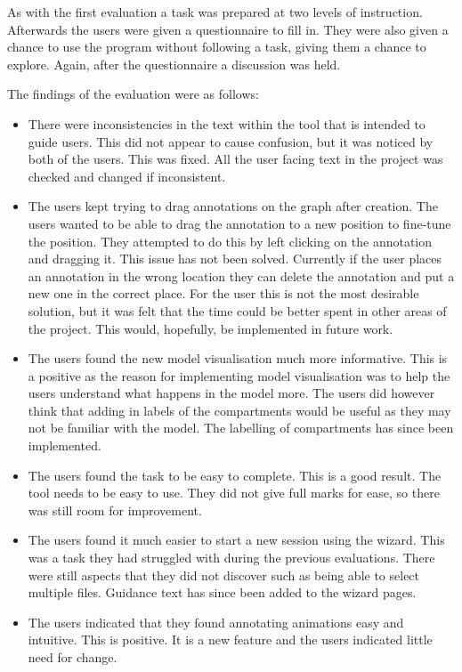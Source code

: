 As with the first evaluation a task was prepared at two levels of instruction.  Afterwards the users were given a questionnaire to fill in.  They were also given a chance to use the program without following a task, giving them a chance to explore.  Again, after the questionnaire a discussion was held.

The findings of the evaluation were as follows:

\begin{itemize}
\item There were inconsistencies in the text within the tool that is intended to guide users.  This did not appear to cause confusion, but it was noticed by both of the users.  This was fixed.  All the user facing text in the project was checked and changed if inconsistent.
\item The users kept trying to drag annotations on the graph after creation. The users wanted to be able to drag the annotation to a new position to fine-tune the position.  They attempted to do this by left clicking on the annotation and dragging it.  This issue has not been solved.  Currently if the user places an annotation in the wrong location they can delete the annotation and put a new one in the correct place.  For the user this is not the most desirable solution, but it was felt that the time could be better spent in other areas of the project.  This would, hopefully, be implemented in future work.
\item The users found the new model visualisation much more informative.  This is a positive as the reason for implementing model visualisation was to help the users understand what happens in the model more.  The users did however think that adding in labels of the compartments would be useful as they may not be familiar with the model.  The labelling of compartments has since been implemented.
\item The users found the task to be easy to complete.  This is a good result.  The tool needs to be easy to use.  They did not give full marks for ease, so there was still room for improvement.
\item The users found it much easier to start a new session using the wizard.  This was a task they had struggled with during the previous evaluations.  There were still aspects that they did not discover such as being able to select multiple files.  Guidance text has since been added to the wizard pages.
\item The users indicated that they found annotating animations easy and intuitive.  This is positive.  It is a new feature and the users indicated little need for change.

\end{itemize}
